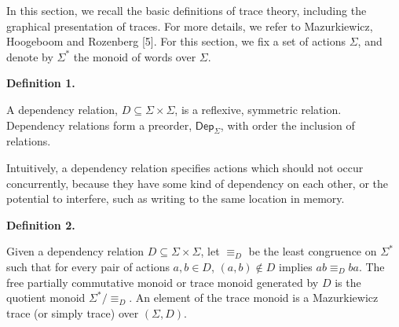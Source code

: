 \documentclass[10pt,a4paper]{article}
\begin{document}
 
In this section, we recall the basic definitions of trace theory, including the graphical presentation of traces. For more details, we refer to Mazurkiewicz, Hoogeboom and Rozenberg [5]. For this section, we fix a set of actions $\Sigma$, and denote by $\Sigma^{*}$ the monoid of words over $\Sigma$.\par
 
 
 
\par\medskip\noindent\textbf{Definition 1.}\par
 
 
A dependency relation, $D\subseteq\Sigma\times\Sigma$, is a reflexive, symmetric relation. Dependency relations form a preorder, $\mathsf{Dep}_{\Sigma}$, with order the inclusion of relations.\par
 
 
 
 
Intuitively, a dependency relation specifies actions which should not occur concurrently, because they have some kind of dependency on each other, or the potential to interfere, such as writing to the same location in memory.\par
 
 
 
\par\medskip\noindent\textbf{Definition 2.}\par
 
 
Given a dependency relation $D\subseteq\Sigma\times\Sigma$, let $\equiv_{D}$ be the least congruence on $\Sigma^{*}$ such that for every pair of actions $a,b\in D$, $(a,b)\notin D$ implies $ab\equiv_{D}ba$. The free partially commutative monoid or trace monoid generated by $D$ is the quotient monoid $\Sigma^{*}/{\equiv_{D}}$. An element of the trace monoid is a Mazurkiewicz trace (or simply trace) over $(\Sigma,D)$.\par
 
 
 
 
\end{document}
